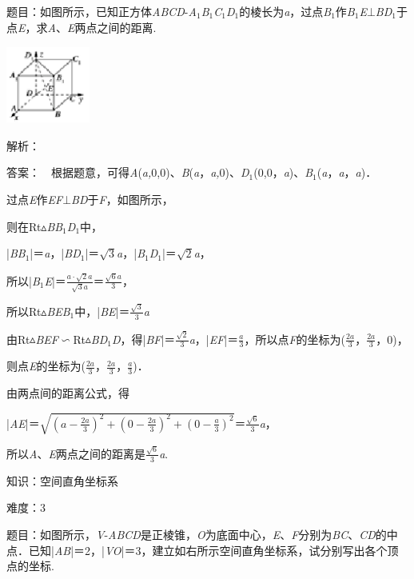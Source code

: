 \documentclass{article} %
\begin{document}
题目：如图所示，已知正方体\textit{ABCD}-\textit{A}${}_{1}$\textit{B}${}_{1}$\textit{C}${}_{1}$\textit{D}${}_{1}$的棱长为\textit{a}，过点\textit{B}${}_{1}$作\textit{B}${}_{1}$\textit{E}$\mathrm{\bot}$\textit{BD}${}_{1}$于点\textit{E}，求\textit{A}、\textit{E}两点之间的距离.

\includegraphics*[width=1.08in, height=1.00in, keepaspectratio=false]{image311}

解析：

答案：　根据题意，可得\textit{A}(\textit{a,}0,0)、\textit{B}(\textit{a}，\textit{a,}0)、\textit{D}${}_{1}$(0,0，\textit{a})、\textit{B}${}_{1}$(\textit{a}，\textit{a}，\textit{a})．

过点\textit{E}作\textit{EF}$\mathrm{\bot}$\textit{BD}于\textit{F}，如图所示，

则在Rt$\mathrm{\vartriangle}$\textit{BB}${}_{1}$\textit{D}${}_{1}$中，

|\textit{BB}${}_{1}$|＝\textit{a}，|\textit{BD}${}_{1}$|＝$\sqrt{3}$\textit{a}，|\textit{B}${}_{1}$\textit{D}${}_{1}$|＝$\sqrt{2}$\textit{a}，

所以|\textit{B}${}_{1}$\textit{E}|＝$\frac{a\cdot \sqrt{2}a}{\sqrt{3}a}$＝$\frac{\sqrt{6}a}{3}$，

所以Rt$\mathrm{\vartriangle}$\textit{BEB}${}_{1}$中，|\textit{BE}|＝$\frac{\sqrt{3}}{3}$\textit{a}

由Rt$\mathrm{\vartriangle}$\textit{BEF}$\mathrm{\backsim}$Rt$\mathrm{\vartriangle}$\textit{BD}${}_{1}$\textit{D}，得|\textit{BF}|＝$\frac{\sqrt{2}}{3}$\textit{a}，|\textit{EF}|＝$\frac{a}{3}$，所以点\textit{F}的坐标为($\frac{2a}{3}$，$\frac{2a}{3}$，0)，

则点\textit{E}的坐标为($\frac{2a}{3}$，$\frac{2a}{3}$，$\frac{a}{3}$)．

由两点间的距离公式，得

|\textit{AE}|＝$\sqrt{(a-\frac{2a}{3})^2+(0-\frac{2a}{3})^2+(0-\frac{a}{3})^2}$＝$\frac{\sqrt{6}}{3}$\textit{a}，

所以\textit{A}、\textit{E}两点之间的距离是$\frac{\sqrt{6}}{3}$\textit{a}.

知识：空间直角坐标系

难度：3

题目：如图所示，\textit{V}-\textit{ABCD}是正棱锥，\textit{O}为底面中心，\textit{E}、\textit{F}分别为\textit{BC}、\textit{CD}的中点．已知|\textit{AB}|＝2，|\textit{VO}|＝3，建立如右所示空间直角坐标系，试分别写出各个顶点的坐标.
\end{document}
